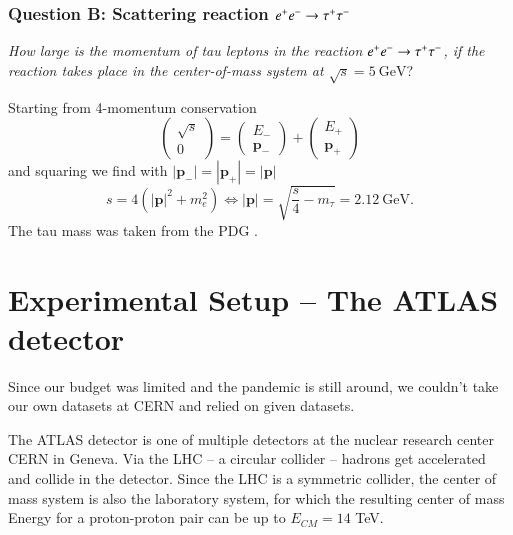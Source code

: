 \documentclass[11pt,a4paper,notitlepage]{scrartcl}
\begin{document}
\subsubsection*{Question B: Scattering reaction $\boldmath e^+e^-\to\tau^+\tau^-$}

\indent \emph{How large is the momentum of tau leptons in the reaction $\boldmath e^+e^-\to\tau^+\tau^-$, if the reaction takes place in the center-of-mass system at $\sqrt{s}=\SI{5}{\giga\eV}$}?

Starting from 4-momentum conservation $$\begin{pmatrix}
	\sqrt{s} \\
	0
\end{pmatrix}=\begin{pmatrix}
E_-\\
\mathbf{p}_-
\end{pmatrix} +\begin{pmatrix}
E_+\\
\mathbf{p}_+
\end{pmatrix} $$
and squaring we find with $|\mathbf{p}_-|=|\mathbf{p}_+|=|\mathbf{p}|$  $$s=4(|\mathbf{p}|^2+m_e^2) \Leftrightarrow |\mathbf{p}| = \sqrt{\frac{s}{4}-m_\tau}=\SI{2.12}{\giga\eV}.$$
The tau mass was taken from the PDG \cite{pdg}.
\newpage
\section{Experimental Setup -- The ATLAS detector}
\label{sec:exp}
Since our budget was limited and the pandemic is still around, we couldn't take our own datasets at CERN and relied on given datasets. %

The ATLAS detector is one of multiple detectors at the nuclear research center CERN in Geneva. Via the LHC -- a circular collider -- hadrons get accelerated and collide in the detector. Since the LHC is a symmetric collider, the center of mass system is also the laboratory system, for which the resulting center of mass Energy for a proton-proton pair can be up to $E_{CM}=14$ TeV. \cite{manual}   
\end{document}
